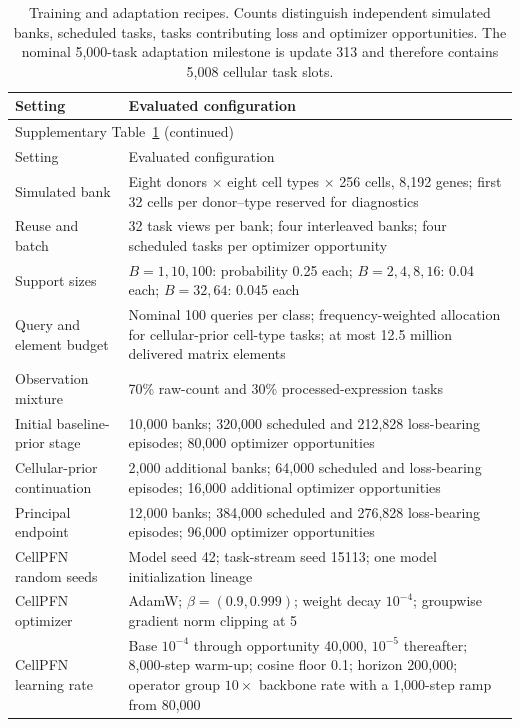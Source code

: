 \begingroup
\small
\setlength{\tabcolsep}{4pt}
\renewcommand{\arraystretch}{1.13}
\begin{longtable}{p{}p{}}
\caption{Training and adaptation recipes. Counts distinguish independent simulated banks, scheduled tasks, tasks contributing loss and optimizer opportunities. The nominal 5,000-task adaptation milestone is update 313 and therefore contains 5,008 cellular task slots.}\label{tab:training-recipe}\\
\toprule
Setting & Evaluated configuration\\\midrule
\endfirsthead
\multicolumn{2}{l}{Supplementary Table~\ref{tab:training-recipe} (continued)}\\
\toprule Setting & Evaluated configuration\\\midrule
\endhead
Simulated bank & Eight donors $\times$ eight cell types $\times$ 256 cells, 8,192 genes; first 32 cells per donor--type reserved for diagnostics\\
Reuse and batch & 32 task views per bank; four interleaved banks; four scheduled tasks per optimizer opportunity\\
Support sizes & $B=1,10,100$: probability 0.25 each; $B=2,4,8,16$: 0.04 each; $B=32,64$: 0.045 each\\
Query and element budget & Nominal 100 queries per class; frequency-weighted allocation for cellular-prior cell-type tasks; at most 12.5 million delivered matrix elements\\
Observation mixture & 70\% raw-count and 30\% processed-expression tasks\\
Initial baseline-prior stage & 10,000 banks; 320,000 scheduled and 212,828 loss-bearing episodes; 80,000 optimizer opportunities\\
Cellular-prior continuation & 2,000 additional banks; 64,000 scheduled and loss-bearing episodes; 16,000 additional optimizer opportunities\\
Principal endpoint & 12,000 banks; 384,000 scheduled and 276,828 loss-bearing episodes; 96,000 optimizer opportunities\\
CellPFN random seeds & Model seed 42; task-stream seed 15113; one model initialization lineage\\
CellPFN optimizer & AdamW; $\beta=(0.9,0.999)$; weight decay $10^{-4}$; groupwise gradient norm clipping at 5\\
CellPFN learning rate & Base $10^{-4}$ through opportunity 40,000, $10^{-5}$ thereafter; 8,000-step warm-up; cosine floor 0.1; horizon 200,000; operator group $10\times$ backbone rate with a 1,000-step ramp from 80,000\\

\end{longtable}
